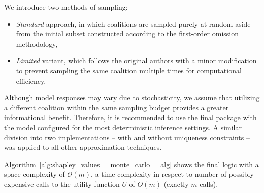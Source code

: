 We introduce two methods of sampling:
\begin{itemize}
    \item \textit{Standard} approach, in which coalitions are sampled purely at random aside from the initial subset constructed according to the first-order omission methodology,
    \item \textit{Limited} variant, which follows the original authors with a minor modification to prevent sampling the same coalition multiple times for computational efficiency.
\end{itemize}

\newpage
Although model responses may vary due to stochasticity, we assume that utilizing a different coalition within the same sampling budget provides a greater informational benefit. Therefore, it is recommended to use the final package with the model configured for the most deterministic inference settings. A similar division into two implementations -- with and without uniqueness constraints -- was applied to all other approximation techniques.

Algorithm~\ref{alg:shapley_values__monte_carlo__alg} shows the final logic with a space complexity of $\mathcal{O}(m)$, a time complexity in respect to number of possibly expensive calls to the utility function $U$ of $O(m)$ (exactly $m$ calls).

